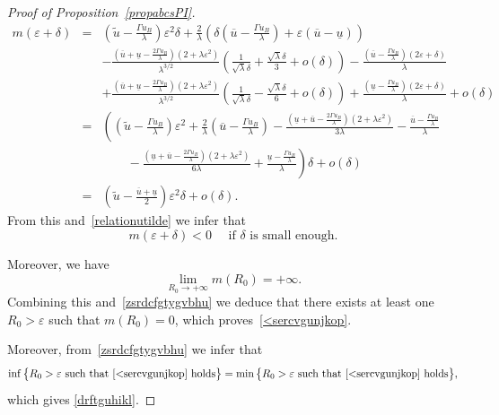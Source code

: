 \documentclass[12pt,a4paper,intlimits,sumlimits]{amsart}
\theoremstyle{definition}
\theoremstyle{plain}
\numberwithin{equation}{section}
\begin{document}
\begin{proof}[Proof of Proposition~\ref{propabcsPI}]
\begin{eqnarray*}
m(\varepsilon+\delta)&=&
\left(\widetilde u-\frac{\Gamma u_B}\lambda\right)
\varepsilon^2\delta
+\frac2{\lambda}\left(
\delta\left(\overline{u}-\frac{\Gamma u_B}{\lambda}\right)
+\varepsilon(\overline{u}-\underline{u})\right)
\\&&
-\frac{\left(\overline{u}+\underline{u}-\frac{2\Gamma u_B}{\lambda}\right)
(2 + \lambda \varepsilon^2)}{\lambda^{3/2}}
\left(\frac{1}{\sqrt{\lambda}\delta}+\frac{\sqrt{\lambda}\delta}{3}+o(\delta)\right)
-\frac{\left(\overline{u}-\frac{\Gamma u_B}\lambda\right)(2\varepsilon+\delta)}{\lambda}
\\&&+
\frac{\left(\overline{u}+\underline{u}-\frac{2\Gamma u_B}{\lambda}\right)
(2 + \lambda \varepsilon^2) }{\lambda^{3/2}}
\left(\frac{1}{\sqrt{\lambda}\delta}
-\frac{\sqrt{\lambda}\delta}{6}+o(\delta)\right)
+\frac{
\left(\underline{u}-\frac{\Gamma u_B}\lambda\right)(2\varepsilon+\delta)}{\lambda}+o(\delta)\\
&=&
\left(\left(\widetilde u-\frac{\Gamma u_B}\lambda\right)
\varepsilon^2
+\frac2{\lambda}\left(\overline{u}-\frac{\Gamma u_B}{\lambda}\right)
-
\frac{\left(\underline{u}+\overline{u}-\frac{2\Gamma u_B}{\lambda}\right)
(2 + \lambda \varepsilon^2) }{3\lambda}
-\frac{\overline{u}-\frac{\Gamma u_B}\lambda}{\lambda}
\right.\\&&\left.\qquad
-
\frac{\left(\underline{u}+\overline{u}-\frac{2\Gamma u_B}{\lambda}\right)
(2 + \lambda \varepsilon^2) }{6\lambda}
+\frac{
\underline{u}-\frac{\Gamma u_B}\lambda}{\lambda}
\right)\delta +o(\delta)\\&=&
\left(\widetilde u-\frac{\overline{u}+\underline{u}}2\right)
\varepsilon^2\delta +o(\delta)
.
\end{eqnarray*}
From this and~\eqref{relationutilde} we infer that
\begin{equation}\label{zsrdcfgtygvbhu}
m(\varepsilon+\delta)<0  \quad \mbox{ if $\delta$ is small enough}.
\end{equation}

Moreover, we have 
\begin{equation*}
\lim_{R_0\to +\infty}m(R_0)=+\infty.
\end{equation*}
Combining this and~\eqref{zsrdcfgtygvbhu} we deduce that there exists at least one $R_0>\varepsilon$ such that $m(R_0)=0$, which proves~\eqref{<sercvgunjkop}.

Moreover, from~\eqref{zsrdcfgtygvbhu} we infer that
\[
\inf\big\{R_0>\varepsilon \mbox{ such that $\eqref{<sercvgunjkop}$ holds}\big\}=\min\big\{R_0>\varepsilon \mbox{ such that $\eqref{<sercvgunjkop}$ holds}\big\},
\]
which gives \eqref{drftguhikl}.


\end{proof}
\end{document}

